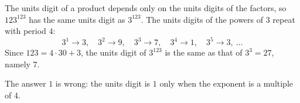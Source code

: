 The units digit of a product depends only on the units digits of the factors, so $123^{123}$ has the same units digit as $3^{123}$. The units digits of the powers of $3$ repeat with period $4$:
\[3^1\to3,\quad 3^2\to9,\quad 3^3\to7,\quad 3^4\to1,\quad 3^5\to3,\ \dots\]
Since $123=4\cdot30+3$, the units digit of $3^{123}$ is the same as that of $3^3=27$, namely $\boxed{7}$.

The answer $1$ is wrong: the units digit is $1$ only when the exponent is a multiple of $4$.
